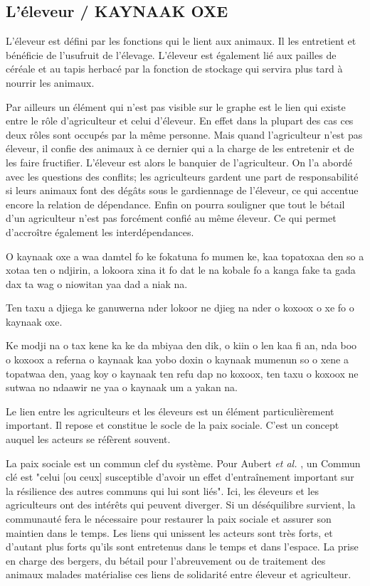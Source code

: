 \subsection{L'éleveur / KAYNAAK OXE}

\begin{paracol}{2}
  L'éleveur est défini par les fonctions qui le lient aux animaux. Il les entretient et bénéficie de l'usufruit de l'élevage. L'éleveur est également lié aux pailles de céréale et au tapis herbacé par la fonction de stockage qui servira plus tard à nourrir les animaux.

  Par ailleurs un élément qui n'est pas visible sur le graphe est le lien qui existe entre le rôle d'agriculteur et celui d'éleveur. En effet dans la plupart des cas ces deux rôles sont occupés par la même personne. Mais quand l'agriculteur n'est pas éleveur, il confie des animaux à ce dernier qui a la charge de les entretenir et de les faire fructifier. L'éleveur est alors le banquier de l'agriculteur. On l'a abordé avec les questions des conflits; les agriculteurs gardent une part de responsabilité si leurs animaux font des dégâts sous le gardiennage de l'éleveur, ce qui accentue encore la relation de dépendance. Enfin on pourra souligner que tout le bétail d'un agriculteur n'est pas forcément confié au même éleveur. Ce qui permet d'accroître également les interdépendances.\\

  \switchcolumn %

  O kaynaak oxe a waa damtel fo ke fokatuna fo mumen ke, kaa topatoxaa den so a xotaa ten o ndjirin, a lokoora xina it fo dat le na kobale fo a kanga fake ta gada dax ta wag o niowitan yaa dad a niak na.

  Ten taxu a djiega ke ganuwerna nder lokoor ne djieg na nder o koxoox o xe fo o kaynaak oxe.

  Ke modji na o tax kene ka ke da mbiyaa den dik, o kiin o len kaa fi an, nda boo o koxoox a referna o kaynaak kaa yobo doxin o kaynaak mumenun so o xene a topatwaa den, yaag koy o kaynaak ten refu dap no koxoox, ten taxu o koxoox ne sutwaa no ndaawir ne yaa o kaynaak um a yakan na.

  \switchcolumn %
  Le lien entre les agriculteurs et les éleveurs est un élément particulièrement important. Il repose et constitue le socle de la paix sociale. C'est un concept auquel les acteurs se réfèrent souvent.

  La paix sociale est un commun clef du système. Pour Aubert \textit{et al.} \cite{land_tenure_and_development_technical_committee_opportunities_2017}, un Commun clé est "celui [ou ceux] susceptible d’avoir un effet d’entraînement important sur la résilience des autres communs qui lui sont liés". Ici, les éleveurs et les agriculteurs ont des intérêts qui peuvent diverger. Si un déséquilibre survient, la communauté fera le nécessaire pour restaurer la paix sociale et assurer son maintien dans le temps. Les liens qui unissent les acteurs sont très forts, et d'autant plus forts qu'ils sont entretenus dans le temps et dans l'espace. La prise en charge des bergers, du bétail pour l'abreuvement ou de traitement des animaux malades matérialise ces liens de solidarité entre éleveur et agriculteur.


\end{paracol}
